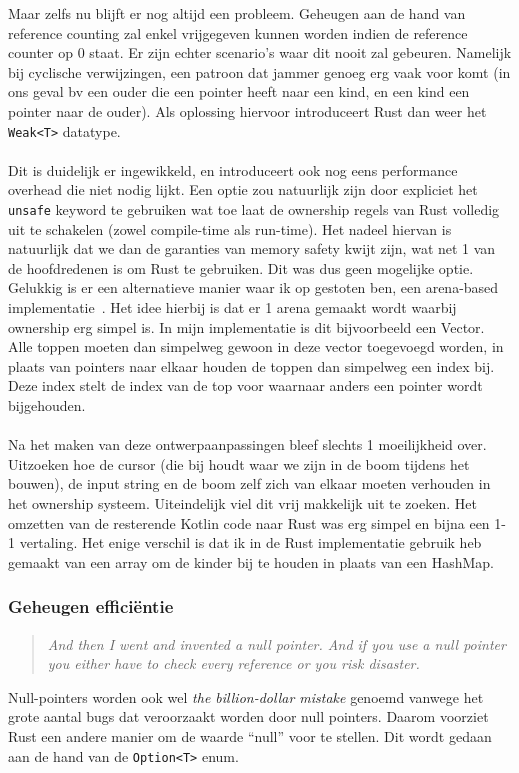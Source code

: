 Maar zelfs nu blijft er nog altijd een probleem.
Geheugen aan de hand van reference counting zal enkel vrijgegeven kunnen worden indien de reference counter op 0 staat.
Er zijn echter scenario's waar dit nooit zal gebeuren.
Namelijk bij cyclische verwijzingen, een patroon dat jammer genoeg erg vaak voor komt (in ons geval bv een ouder die een pointer heeft naar een kind, en een kind een pointer naar de ouder).
Als oplossing hiervoor introduceert Rust dan weer het \texttt{Weak<T>} datatype.
\\ \\
Dit is duidelijk er ingewikkeld, en introduceert ook nog eens performance overhead die niet nodig lijkt.
Een optie zou natuurlijk zijn door expliciet het \texttt{unsafe} keyword te gebruiken wat toe laat de ownership regels van Rust volledig uit te schakelen (zowel compile-time als run-time).
Het nadeel hiervan is natuurlijk dat we dan de garanties van memory safety kwijt zijn, wat net 1 van de hoofdredenen is om Rust te gebruiken.
Dit was dus geen mogelijke optie.
Gelukkig is er een alternatieve manier waar ik op gestoten ben, een arena-based implementatie~\cite{rust_arena_trees}.
Het idee hierbij is dat er 1 arena gemaakt wordt waarbij ownership erg simpel is.
In mijn implementatie is dit bijvoorbeeld een Vector.
Alle toppen moeten dan simpelweg gewoon in deze vector toegevoegd worden, in plaats van pointers naar elkaar houden de toppen dan simpelweg een index bij.
Deze index stelt de index van de top voor waarnaar anders een pointer wordt bijgehouden.
\\ \\
Na het maken van deze ontwerpaanpassingen bleef slechts 1 moeilijkheid over.
Uitzoeken hoe de cursor (die bij houdt waar we zijn in de boom tijdens het bouwen), de input string en de boom zelf zich van elkaar moeten verhouden in het ownership systeem.
Uiteindelijk viel dit vrij makkelijk uit te zoeken.
Het omzetten van de resterende Kotlin code naar Rust was erg simpel en bijna een 1-1 vertaling.
Het enige verschil is dat ik in de Rust implementatie gebruik heb gemaakt van een array om de kinder bij te houden in plaats van een HashMap.

\subsubsection{Geheugen efficiëntie}
\begin{quote}
    \textit{And then I went and invented a null pointer.
    And if you use a null pointer you either have to check every reference or you risk disaster. \cite{null_mistake}}
\end{quote}
Null-pointers worden ook wel \textit{the billion-dollar mistake} genoemd vanwege het grote aantal bugs dat veroorzaakt worden door null pointers.
Daarom voorziet Rust een andere manier om de waarde ``null'' voor te stellen.
Dit wordt gedaan aan de hand van de \texttt{Option<T>} enum.

